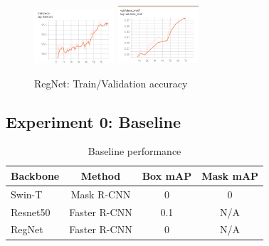 \documentclass[10pt,twocolumn,letterpaper]{article}
\begin{document}


\begin{figure}[H]
     \centering
     {{\includegraphics[width=3cm]{docs/latex/images/eric/base train acc.png} }}
     \qquad
     {{\includegraphics[width=3cm]{docs/latex/images/eric/base val bbox map.png} }}
     \caption{RegNet: Train/Validation accuracy}
     \label{fig:figure1}
\end{figure}

\subsection{Experiment 0: Baseline}

\begin{table}[hbt!]
\begin{center}
\begin{tabular}{|l|c|c|c|}
\hline
Backbone & Method   & Box mAP & Mask mAP \\
\hline\hline
Swin-T   & Mask R-CNN & 0    & 0 \\
Resnet50   & Faster R-CNN & 0.1 & N/A \\
RegNet & Faster R-CNN & 0 & N/A \\
\hline
\end{tabular}
\end{center}
\caption{Baseline performance}
\end{table}
\end{document}
